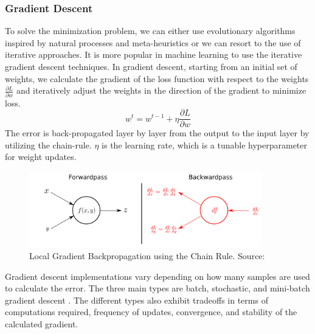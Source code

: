 \subsubsection{Gradient Descent}


To solve the minimization problem, we can either use evolutionary algorithms \cite{fonseca1995overview} inspired by natural processes and meta-heuristics or we can resort to the use of iterative approaches. It is more popular in machine learning to use the iterative gradient descent techniques. In gradient descent, starting from an initial set of weights, we calculate the gradient of the loss function with respect to the weights  $  \frac{\partial L}{\partial w}  $ and iteratively adjust the weights in the direction of the gradient to minimize loss.
\begin{equation}
 w^{t} = w^{t-1} +  \eta \frac{\partial L}{\partial w} 
\end{equation}
The error is back-propagated layer by layer from the output to the input layer by utilizing the chain-rule. $\eta $ is the learning rate, which is a tunable hyperparameter for weight updates.
 
 \begin{figure}[h!]
\centering
\includegraphics[width=0.9\textwidth]{Figures/backprop}
\caption[Local Backpropagation]{ Local Gradient Backpropagation using the Chain Rule. Source:\footnotemark} 
\label{fig:Forward and Backward Passs}
\end{figure}


Gradient descent implementations vary depending on how many samples are used to calculate the error. The three main types are batch, stochastic, and mini-batch gradient descent \cite{ruder2016overview}. The different types also exhibit tradeoffs in terms of computations required, frequency of updates, convergence, and stability of the calculated gradient. 

